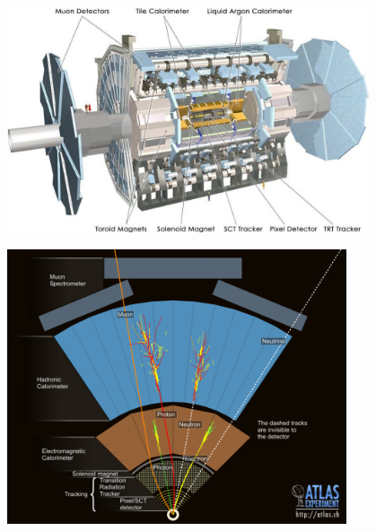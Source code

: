 \documentclass{beamer}
\newcommand*{\header}[1]{\fontsize{16}{8}\selectfont \textbf{{\color{MyPurple}{#1}}}}
\begin{document}
\begin{frame}
\begin{center}
\header{The ATLAS Detector}
\end{center}
\begin{center}
\includegraphics[width=0.8\textwidth]{figures/ATLAS_det}
\end{center}
\end{frame}

\begin{frame}
\begin{center}
\header{Particles in the Detector}
\end{center}
\begin{center}
\includegraphics[width=0.75\textwidth]{figures/layers}
\end{center}
\end{frame}
\end{document}
